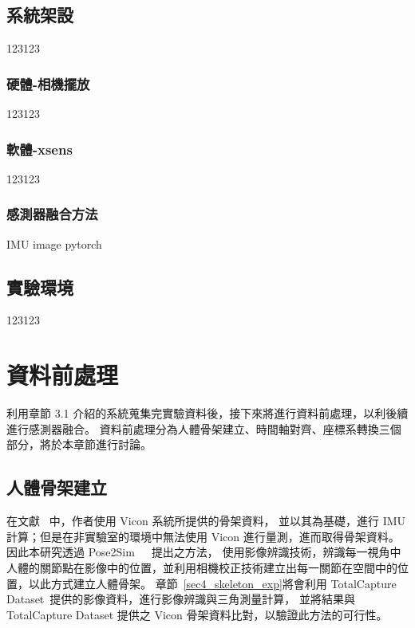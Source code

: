 \subsection{系統架設}
123123
\subsubsection{硬體-相機擺放}
123123
\subsubsection{軟體-xsens}
123123
\subsubsection{感測器融合方法}
IMU image pytorch

\subsection{實驗環境}
123123

\section{資料前處理}
利用章節 3.1 介紹的系統蒐集完實驗資料後，接下來將進行資料前處理，以利後續進行感測器融合。
資料前處理分為人體骨架建立、時間軸對齊、座標系轉換三個部分，將於本章節進行討論。

\subsection{人體骨架建立}\label{sec3_skeleton_method}
在文獻~\cite{zhang2020fusing} 中，作者使用 Vicon 系統所提供的骨架資料，
並以其為基礎，進行 IMU 計算；但是在非實驗室的環境中無法使用 Vicon 進行量測，進而取得骨架資料。
因此本研究透過 Pose2Sim~\cite{Pagnon_2021_Robustness}~\cite{Pagnon_2022_Accuracy}~\cite{Pagnon_2022_JOSS}提出之方法，
使用影像辨識技術，辨識每一視角中人體的關節點在影像中的位置，並利用相機校正技術建立出每一關節在空間中的位置，以此方式建立人體骨架。
章節~\ref{sec4_skeleton_exp}將會利用 TotalCapture Dataset~\cite{Trumble:BMVC:2017}提供的影像資料，進行影像辨識與三角測量計算，
並將結果與 TotalCapture Dataset 提供之 Vicon 骨架資料比對，以驗證此方法的可行性。

